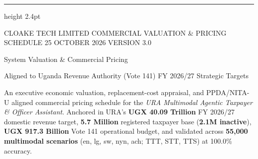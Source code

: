 \documentclass[10pt,a4paper]{article}
\newcommand{\code}[1]{{\datafont\fontsize{8.2}{9}\selectfont\textcolor{inkii}{#1}}}
\begin{document}
\begin{titlepage}
\AddToShipoutPictureBG*{\AtPageLowerLeft{\color{ground}\rule{\paperwidth}{\paperheight}}}
\thispagestyle{empty}
{\color{ink}\hrule height 2.4pt}
\vspace{4mm}
{\fontsize{8.2}{10}\selectfont\textcolor{slate}{CLOAKE TECH LIMITED}%
 \hspace{6mm}\textcolor{inkiii}{COMMERCIAL VALUATION \& PRICING SCHEDULE \textperiodcentered{} 25 OCTOBER 2026 \textperiodcentered{} VERSION 3.0}\par}

\vspace{32mm}
{\displayfont\fontsize{28}{32}\selectfont\textcolor{ink}{System Valuation \& Commercial Pricing}\par}
\vspace{4mm}
{\fontsize{12}{15}\selectfont\textcolor{slate}{Aligned to Uganda Revenue Authority (Vote 141) FY 2026/27 Strategic Targets}\par}
\vspace{7mm}
{\fontsize{11.5}{16}\selectfont\color{inkii}
\begin{minipage}{142mm}\RaggedRight
An executive economic valuation, replacement-cost appraisal, and PPDA/NITA-U aligned
commercial pricing schedule for the \emph{URA Multimodal Agentic Taxpayer \& Officer Assistant}.
Anchored in URA's \textbf{UGX 40.09 Trillion} FY 2026/27 domestic revenue target,
\textbf{5.7 Million} registered taxpayer base (\textbf{2.1M inactive}), \textbf{UGX 917.3 Billion}
Vote 141 operational budget, and validated across \textbf{55,000 multimodal scenarios}
(\code{en}, \code{lg}, \code{sw}, \code{nyn}, \code{ach}; \code{TTT}, \code{STT}, \code{TTS}) at 100.0\% accuracy.
\end{minipage}\par}


\end{titlepage}
\end{document}
